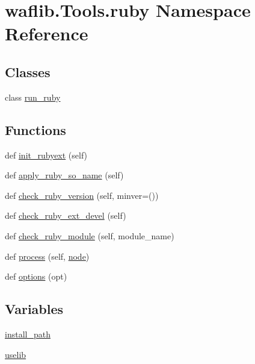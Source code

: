 \hypertarget{namespacewaflib_1_1_tools_1_1ruby}{}\section{waflib.\+Tools.\+ruby Namespace Reference}
\label{namespacewaflib_1_1_tools_1_1ruby}
\subsection*{Classes}
\begin{DoxyCompactItemize}
\item 
class \hyperlink{classwaflib_1_1_tools_1_1ruby_1_1run__ruby}{run\+\_\+ruby}
\end{DoxyCompactItemize}
\subsection*{Functions}
\begin{DoxyCompactItemize}
\item 
def \hyperlink{namespacewaflib_1_1_tools_1_1ruby_aefe90baeace8b05bd0038dec33a25d4f}{init\+\_\+rubyext} (self)
\item 
def \hyperlink{namespacewaflib_1_1_tools_1_1ruby_a91ccae4c2fd8fd022d9cf0b408b30ba5}{apply\+\_\+ruby\+\_\+so\+\_\+name} (self)
\item 
def \hyperlink{namespacewaflib_1_1_tools_1_1ruby_a6b1426d0a007a1d029dd549463f35792}{check\+\_\+ruby\+\_\+version} (self, minver=())
\item 
def \hyperlink{namespacewaflib_1_1_tools_1_1ruby_a1152f26b41ce01670cf061540c07642a}{check\+\_\+ruby\+\_\+ext\+\_\+devel} (self)
\item 
def \hyperlink{namespacewaflib_1_1_tools_1_1ruby_a56fd37d84970b70e399a27f937a3c8c6}{check\+\_\+ruby\+\_\+module} (self, module\+\_\+name)
\item 
def \hyperlink{namespacewaflib_1_1_tools_1_1ruby_abc8e4baeca74633f0dc718700b547b88}{process} (self, \hyperlink{structnode}{node})
\item 
def \hyperlink{namespacewaflib_1_1_tools_1_1ruby_a81332d72c1973177fb7f913b94ea205d}{options} (opt)
\end{DoxyCompactItemize}
\subsection*{Variables}
\begin{DoxyCompactItemize}
\item 
\hyperlink{namespacewaflib_1_1_tools_1_1ruby_a2322799c208e6c4c9970d050d573f99d}{install\+\_\+path}
\item 
\hyperlink{namespacewaflib_1_1_tools_1_1ruby_a248bdfa34ce4325e0b76a4208f77a973}{uselib}
\end{DoxyCompactItemize}


